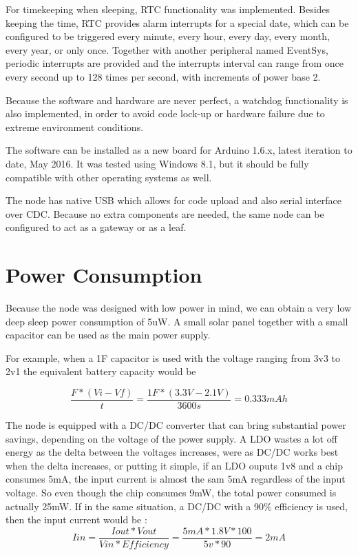 For timekeeping when sleeping, RTC functionality was implemented. Besides keeping the time, RTC
provides alarm interrupts for a special date, which can be configured to be triggered every
minute, every hour, every day, every month, every year, or only once. Together with another
peripheral named EventSys, periodic interrupts are provided and the interrupts interval can range
from once every second up to 128 times per second, with increments of power base 2.

Because the software and hardware are never perfect, a watchdog functionality is also implemented,
in order to avoid code lock-up or hardware failure due to extreme environment conditions.

The software can be installed as a new board for Arduino 1.6.x, latest iteration to date,
May 2016. It was tested using Windows 8.1, but it should be fully compatible with other operating systems as well.

The node has native USB which allows for code upload and also serial interface over CDC. Because no
extra components are needed, the same node can be configured to act as a gateway or
as a leaf.

\label{chap:results}


\section{Power Consumption}

Because the node was designed with low power in mind, we can obtain a very low deep sleep power
consumption of 5uW. A small solar panel together with a
small capacitor can be used as the main power supply.

For example, when a 1F capacitor is used with the voltage ranging from 3v3 to 2v1 the equivalent battery capacity would be

$$ \frac{F * (Vi - Vf)}{t} = \frac{1F * (3.3V - 2.1V)}{3600s} = 0.333mAh$$

The node is equipped with a DC/DC converter that can bring substantial power savings, depending on
the voltage of the power supply. A LDO wastes a lot off energy as the delta between the
voltages increases, were as DC/DC works best when the delta increases, or putting it simple, if an
LDO ouputs 1v8 and a chip consumes 5mA, the input current is almost the sam 5mA regardless of the
input voltage. So even though the chip consumes 9mW, the total power consumed is actually 25mW. If
in the same situation, a DC/DC with a 90\% efficiency is used, then the input current would be :
$$Iin = \frac{Iout * Vout}{Vin*Efficiency} = \frac{5mA * 1.8V*100}{5v*90}= 2mA$$


